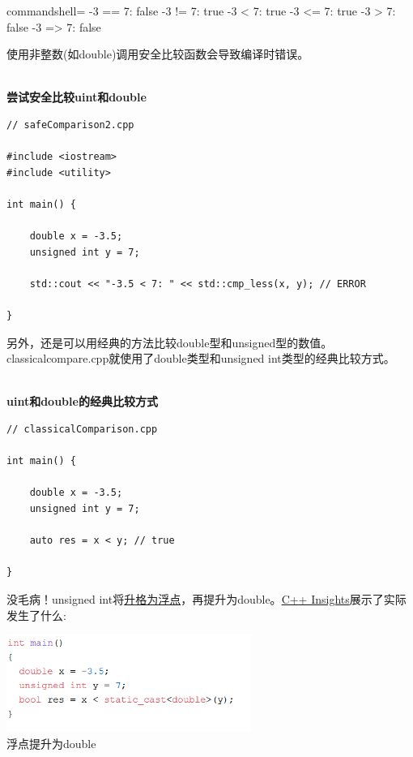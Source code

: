 \begin{tcblisting}{commandshell={}}
-3 == 7: false
-3 != 7: true
-3 < 7: true
-3 <= 7: true
-3 > 7: false
-3 => 7: false
\end{tcblisting}

使用非整数(如double)调用安全比较函数会导致编译时错误。

\hspace*{\fill} \\ %
\noindent
\textbf{尝试安全比较uint和double}
\begin{lstlisting}[style=styleCXX]
// safeComparison2.cpp

#include <iostream>
#include <utility>

int main() {
	
	double x = -3.5;
	unsigned int y = 7;
	
	std::cout << "-3.5 < 7: " << std::cmp_less(x, y); // ERROR
	
}
\end{lstlisting}

另外，还是可以用经典的方法比较double型和unsigned型的数值。classicalcompare.cpp就使用了double类型和unsigned int类型的经典比较方式。

\hspace*{\fill} \\ %
\noindent
\textbf{uint和double的经典比较方式}
\begin{lstlisting}[style=styleCXX]
// classicalComparison.cpp

int main() {
	
	double x = -3.5;
	unsigned int y = 7;
	
	auto res = x < y; // true
	
}
\end{lstlisting}

没毛病！unsigned int将\href{https://en.cppreference.com/w/cpp/language/implicit_conversion}{升格为浮点}，再提升为double。\href{https://cppinsights.io/s/44216566}{C++ Insights}展示了实际发生了什么:

\begin{center}
\includegraphics[width=0.6\textwidth]{content/3/chapter5/images/1-5.png}\\
浮点提升为double
\end{center}

